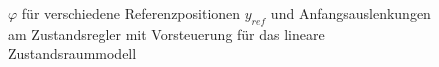 \documentclass[
	pagesize,
	fontsize=12pt,
	paper=a4,
	oneside,
   reqno
]{scrartcl}
\begin{document}
\begin{figure}[H]
    \centering
    \caption[$\varphi$ für Regler mit Vorsteuerung (linear)]{$\varphi$ für verschiedene Referenzpositionen $y_{ref}$ und Anfangsauslenkungen am Zustandsregler mit Vorsteuerung für das lineare Zustandsraummodell}
    \label{fig:Bild15}
\end{figure}
\end{document}
